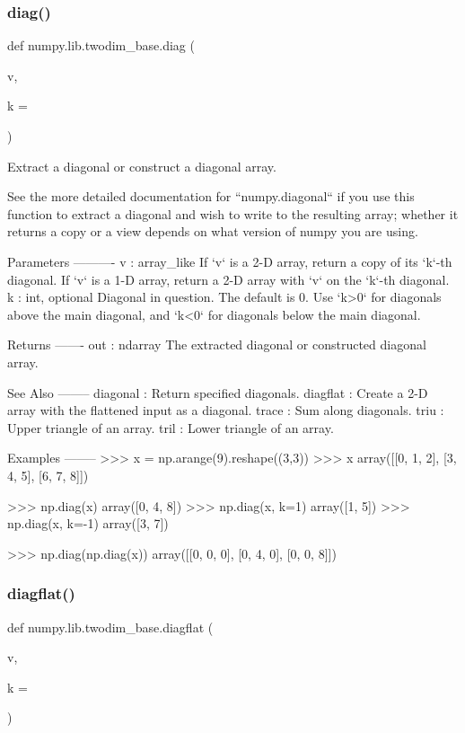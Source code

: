 \subsubsection{\texorpdfstring{diag()}{diag()}}
{\footnotesize\ttfamily def numpy.\+lib.\+twodim\+\_\+base.\+diag (\begin{DoxyParamCaption}\item[{}]{v,  }\item[{}]{k = {} }\end{DoxyParamCaption})}

\begin{DoxyVerb}Extract a diagonal or construct a diagonal array.

See the more detailed documentation for ``numpy.diagonal`` if you use this
function to extract a diagonal and wish to write to the resulting array;
whether it returns a copy or a view depends on what version of numpy you
are using.

Parameters
----------
v : array_like
    If `v` is a 2-D array, return a copy of its `k`-th diagonal.
    If `v` is a 1-D array, return a 2-D array with `v` on the `k`-th
    diagonal.
k : int, optional
    Diagonal in question. The default is 0. Use `k>0` for diagonals
    above the main diagonal, and `k<0` for diagonals below the main
    diagonal.

Returns
-------
out : ndarray
    The extracted diagonal or constructed diagonal array.

See Also
--------
diagonal : Return specified diagonals.
diagflat : Create a 2-D array with the flattened input as a diagonal.
trace : Sum along diagonals.
triu : Upper triangle of an array.
tril : Lower triangle of an array.

Examples
--------
>>> x = np.arange(9).reshape((3,3))
>>> x
array([[0, 1, 2],
       [3, 4, 5],
       [6, 7, 8]])

>>> np.diag(x)
array([0, 4, 8])
>>> np.diag(x, k=1)
array([1, 5])
>>> np.diag(x, k=-1)
array([3, 7])

>>> np.diag(np.diag(x))
array([[0, 0, 0],
       [0, 4, 0],
       [0, 0, 8]])\end{DoxyVerb}
 \mbox{\label{namespacenumpy_1_1lib_1_1twodim__base_a2e76d5ad9a99bf0dfbc11ec1eec8a733}} 
\subsubsection{\texorpdfstring{diagflat()}{diagflat()}}
{\footnotesize\ttfamily def numpy.\+lib.\+twodim\+\_\+base.\+diagflat (\begin{DoxyParamCaption}\item[{}]{v,  }\item[{}]{k = {} }\end{DoxyParamCaption})}

